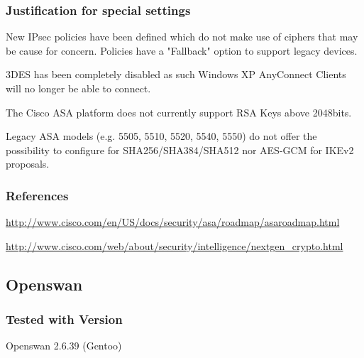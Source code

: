 \subsubsection{Justification for special settings}
New IPsec policies have been defined which do not make use of ciphers that may be cause for concern. Policies have a "Fallback" option to support legacy devices.

3DES has been completely disabled as such Windows XP AnyConnect Clients will no longer be able to connect.

The Cisco ASA platform does not currently support RSA Keys above 2048bits.

Legacy ASA models (e.g. 5505, 5510, 5520, 5540, 5550) do not offer the possibility to configure for SHA256/SHA384/SHA512 nor AES-GCM for IKEv2 proposals.

\subsubsection{References}
\begin{itemize*}
  \item \url{http://www.cisco.com/en/US/docs/security/asa/roadmap/asaroadmap.html}
  \item \url{http://www.cisco.com/web/about/security/intelligence/nextgen_crypto.html}
\end{itemize*}




\subsection{Openswan}


\subsubsection{Tested with Version}
\begin{itemize*}
  \item Openswan 2.6.39 (Gentoo)
\end{itemize*}


